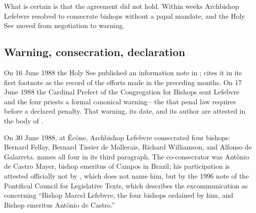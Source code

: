 What is certain is that the agreement did not hold. Within weeks
Archbishop Lefebvre resolved to consecrate bishops without a papal
mandate, and the Holy See moved from negotiation to warning.

\subsection{Warning, consecration, declaration}

On 16 June 1988 the Holy See published an information note in
;  cites it in its first
footnote as the record of the efforts made in the preceding
months. On 17 June 1988 the Cardinal Prefect of
the Congregation for Bishops sent Lefebvre and the four priests a formal
canonical warning---the  that penal law requires before a
declared penalty. That warning, its date, and its author are attested in
the body of .

On 30 June 1988, at Écône, Archbishop Lefebvre consecrated four bishops:
Bernard Fellay, Bernard Tissier de Mallerais, Richard Williamson, and
Alfonso de Galarreta.  names all four in its third
paragraph. The co-consecrator was Antônio de Castro Mayer, bishop
emeritus of Campos in Brazil; his participation is attested officially not
by , which does not name him, but by the 1996 note of
the Pontifical Council for Legislative Texts, which describes the
excommunication as concerning ``Bishop Marcel Lefebvre, the four bishops
ordained by him, and Bishop emeritus Antônio de Castro.''

